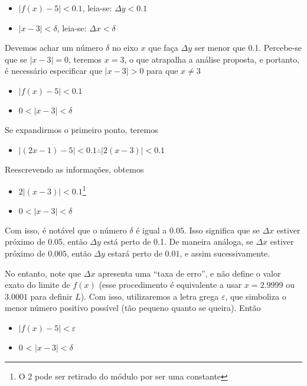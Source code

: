 \begin{itemize}
  \item $|f(x) - 5| < 0.1$, leia-se: $\Delta y < 0.1$
  \item $|x - 3| < \delta$, leia-se: $\Delta x < \delta$
\end{itemize}

Devemos achar um número $\delta$ no eixo $x$ que faça $\Delta y$ ser menor
que 0.1. Percebe-se que se $|x - 3| = 0$, teremos $x = 3$, o que atrapalha a análise proposta, e portanto, é necessário especificar que $|x - 3| > 0$ para que $x\neq 3$

\begin{itemize}
  \item $|f(x) - 5| < 0.1$
  \item $0 < |x - 3| < \delta$
\end{itemize}

Se expandirmos o primeiro ponto, teremos

\begin{itemize}
  \item $|(2x - 1) - 5| < 0.1 \therefore |2(x - 3)| < 0.1$
\end{itemize}

Reescrevendo as informações, obtemos

\begin{itemize}
  \item $2|(x - 3)| < 0.1$\footnote{O 2 pode ser retirado do módulo por ser uma constante}
  \item $0 < |x - 3| < \delta$
\end{itemize}

Com isso, é notável que o número $\delta$ é igual a $0.05$. Isso significa que se $\Delta x$ estiver próximo de $0.05$, então $\Delta y$ está perto de 0.1. De maneira análoga, se $\Delta x$ estiver próximo de $0.005$, então $\Delta y$ estará perto de $0.01$, e assim sucessivamente.

No entanto, note que $\Delta x$ apresenta uma ``taxa de erro'', e não define o valor exato do limite de $f(x)$ (esse procedimento é equivalente a usar $x = 2.9999$ ou $3.0001$ para definir $L$). Com isso, utilizaremos a letra grega $\varepsilon$, que simboliza o menor número positivo possível (tão pequeno quanto se queira). Então

\begin{itemize}
  \item $|f(x) - 5| < \varepsilon$
  \item 0 < $|x - 3| < \delta$
\end{itemize}

